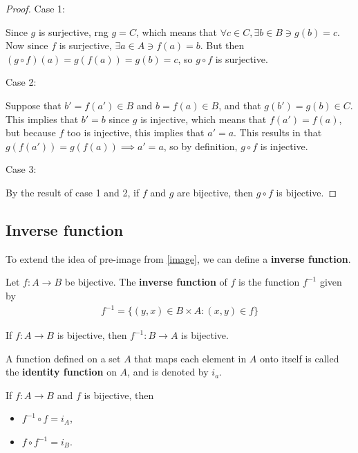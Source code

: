 \begin{proof}
	Case 1:
	
	Since $g$ is surjective, rng $g=C$, which means that $\forall c\in C, \exists b\in B \ni g(b)=c$. Now since $f$ is surjective, $\exists a\in A \ni f(a)=b$. But then $(g\circ f)(a)=g(f(a))=g(b)=c$, so $g\circ f$ is surjective. \bigskip
	
	Case 2:
	
	Suppose that $b'=f(a')\in B$ and $b=f(a)\in B$, and that $g(b')=g(b)\in C$. This implies that $b'=b$ since $g$ is injective, which means that $f(a')=f(a)$, but because $f$ too is injective, this implies that $a'=a$. This results in that $g(f(a'))=g(f(a)) \implies a'=a$, so by definition, $g\circ f$ is injective.
	
	Case 3: 
	
	By the result of case 1 and 2, if $f$ and $g$ are bijective, then $g \circ f$ is bijective.
\end{proof}

\newpage
\subsection{Inverse function}

To extend the idea of pre-image from \ref{image}, we can define a \textbf{inverse function}.

\begin{definition}
	Let $f:A\rightarrow B$ be bijective. The \textbf{inverse function} of $f$ is the function $f^{-1}$ given by
	\begin{align*}
		f^{-1} = \{(y,x)\in B\times A: (x,y)\in f\}
 	\end{align*} 
\end{definition}

\begin{remark}
	If $f:A\rightarrow B$ is bijective, then $f^{-1}:B\rightarrow A$ is bijective. 
\end{remark}

\begin{definition}
	A function defined on a set $A$ that maps each element in $A$ onto itself is called the \textbf{identity function} on $A$, and is denoted by $i_a$.
\end{definition}

\begin{remark}
	If $f:A\rightarrow B$ and $f$ is bijective, then
	\begin{itemize}
		\item $f^{-1}\circ f = i_A$,
		\item $f\circ f^{-1} = i_B$.
	\end{itemize}
\end{remark}


